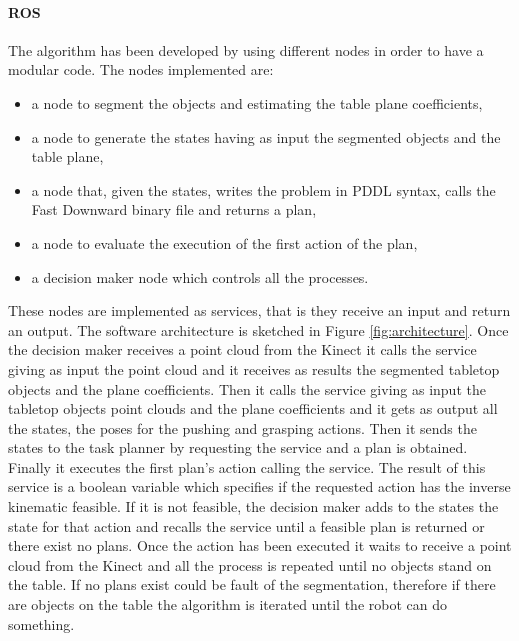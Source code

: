 \paragraph{ROS}
The algorithm has been developed by using different nodes in order to have a modular code. 
The nodes implemented are:
\begin{itemize}
\item a node to segment the objects and estimating the table plane coefficients,
\item a node to generate the states having as input the segmented objects and the table plane,
\item a node that, given the states, writes the problem in PDDL syntax, calls the Fast Downward binary file and returns a plan,
\item a node to evaluate the execution of the first action of the plan,
\item a decision maker node which controls all the processes.  
\end{itemize}
These nodes are implemented as services, that is they receive an input and return an output.
The software architecture is sketched in Figure \ref{fig:architecture}. 
Once the decision maker receives a point cloud from the Kinect it calls the  service giving as input the point cloud and it receives as results the segmented tabletop objects and the plane coefficients. Then it calls the  service giving as input the tabletop objects point clouds and the plane coefficients and it gets as output all the states, the poses for the pushing and grasping actions. Then it sends the states to the task planner by requesting the  service and a plan is obtained. Finally it executes the first plan's action calling the  service. The result of this service is a boolean variable which specifies if the requested action has the inverse kinematic feasible. If it is not feasible, the decision maker adds to the states the  state for that action and recalls the  service until a feasible plan is returned or there exist no plans.
Once the action has been executed it waits to receive a point cloud from the Kinect and all the process is repeated until no objects stand on the table. If no plans exist could be fault of the segmentation, therefore if there are objects on the table the algorithm is iterated until the robot can do something.
